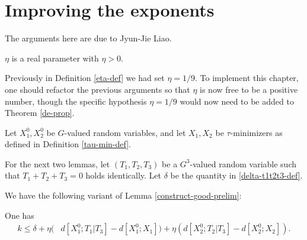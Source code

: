 \chapter{Improving the exponents}

The arguments here are due to Jyun-Jie Liao.

\begin{definition}\label{eta-def-new}\leanok  $\eta$ is a real parameter with $\eta > 0$.
\end{definition}

Previously in Definition \ref{eta-def} we had set $\eta=1/9$.  To implement
this chapter, one should refactor the previous arguments so that $\eta$ is
now free to be a positive number, though the specific hypothesis $\eta=1/9$
would now need to be added to Theorem \ref{de-prop}.

Let $X^0_1, X^0_2$ be $G$-valued random variables, and let $X_1, X_2$ be $\tau$-minimizers as defined in Definition \ref{tau-min-def}.

For the next two lemmas, let $(T_1,T_2,T_3)$ be a $G^3$-valued random variable such that $T_1+T_2+T_3=0$ holds identically. Let $\delta$ be the quantity in \eqref{delta-t1t2t3-def}.

We have the following variant of Lemma \ref{construct-good-prelim}:

\begin{lemma}\label{construct-good-prelim-improv}\leanok
  One has
  \begin{align*}  k \leq
    \delta + \eta (& d[X^0_1;T_1|T_3]-d[X^0_1;X_1])
      + \eta (d[X^0_2;T_2|T_3]-d[X^0_2;X_2]).
  \end{align*}
\end{lemma}


